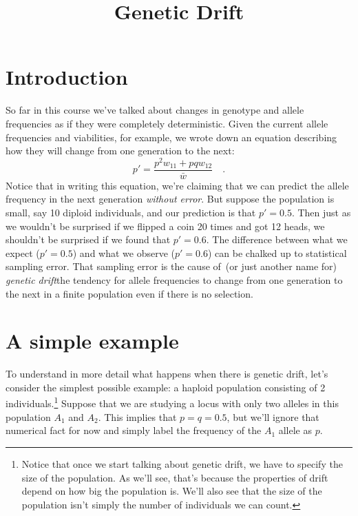 \documentclass[12pt]{article}
\title{Genetic Drift}
\begin{document}
\maketitle

\thispagestyle{first}

\section*{Introduction}

So far in this course we've talked about changes in genotype and
allele frequencies as if they were completely deterministic. Given the
current allele frequencies and viabilities, for example, we wrote down
an equation describing how they will change from one generation to the
next:
\[
p' = \frac{p^2w_{11} + pqw_{12}}{\bar w} \quad .
\]
Notice that in writing this equation, we're claiming that we can
predict the allele frequency in the next generation {\it without
error}. But suppose the population is small, say 10 diploid
individuals, and our prediction is that $p' = 0.5$. Then just as we
wouldn't be surprised if we flipped a coin 20 times and got 12 heads,
we shouldn't be surprised if we found that $p' = 0.6$. The difference
between what we expect ($p' = 0.5$) and what we observe ($p' = 0.6$)
can be chalked up to statistical sampling error. That sampling error
is the cause of~(or just another name for) {\it genetic
drift}{\dash}the tendency for allele frequencies to change from one
generation to the next in a finite population even if there is no
selection.

\section*{A simple example}

To understand in more detail what happens when there is genetic drift,
let's consider the simplest possible example: a haploid population
consisting of 2 individuals.\footnote{Notice that once we start
  talking about genetic drift, we have to specify the size of the
  population. As we'll see, that's because the properties of drift
  depend on how big the population is. We'll also see that the size of
  the population isn't simply the number of individuals we can count.}
Suppose that we are studying a locus with only two alleles in this
population $A_1$ and $A_2$. This implies that $p = q = 0.5$, but we'll
ignore that numerical fact for now and simply label the frequency of
the $A_1$ allele as $p$.
\end{document}
